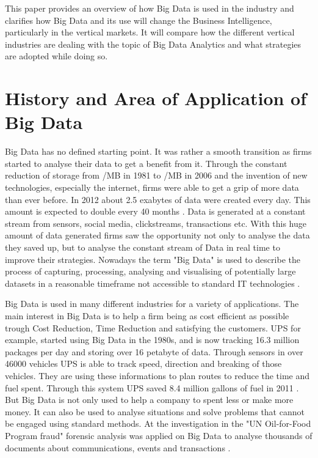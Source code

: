 \documentclass[runningheads]{llncs}
\begin{document}
This paper provides an overview of how Big Data is used in the industry and clarifies how Big Data and its use will change the Business Intelligence, particularly in the vertical markets. It will compare how the different vertical industries are dealing with the topic of Big Data Analytics and what strategies are adopted while doing so.

\section{History and Area of Application of Big Data}
Big Data has no defined starting point. It was rather a smooth transition as firms started to analyse their data to get a benefit from it. Through the constant reduction of storage from /MB in 1981 to /MB in 2006 \cite{PCMAGAZINE} and the invention of new technologies, especially the internet, firms were able to get a grip of more data than ever before. 
In 2012 about 2.5 exabytes of data were created every day. This amount is expected to double every 40 months \cite{MCAFEE}. Data is generated at a constant stream from sensors, social media, clickstreams, transactions etc. With this huge amount of data generated firms saw the opportunity not only to analyse the data they saved up, but to analyse the constant stream of Data in real time to improve their strategies. Nowadays the term "Big Data" is used to describe the process of capturing, processing, analysing and visualising of potentially large datasets in a reasonable timeframe not accessible to standard IT technologies \cite{NESSI}. 

Big Data is used in many different industries for a variety of applications. The main interest in Big Data is to help a firm being as cost efficient as possible trough Cost Reduction, Time Reduction and satisfying the customers. UPS for example, started using Big Data in the 1980s, and is now tracking 16.3 million packages per day and storing over 16 petabyte of data. Through sensors in over 46000 vehicles UPS is able to track speed, direction and breaking of those vehicles. They are using these informations to plan routes to reduce the time and fuel spent. Through this system UPS saved 8.4 million gallons of fuel in 2011 \cite{DAVENPORT}. But Big Data is not only used to help a company to spent less or make more money. It can also be used to analyse situations and solve problems that cannot be engaged using standard methods. At the investigation in the "UN Oil-for-Food Program fraud" forensic analysis was applied on Big Data to analyse thousands of documents about communications, events and transactions \cite{Hans}.
\end{document}
